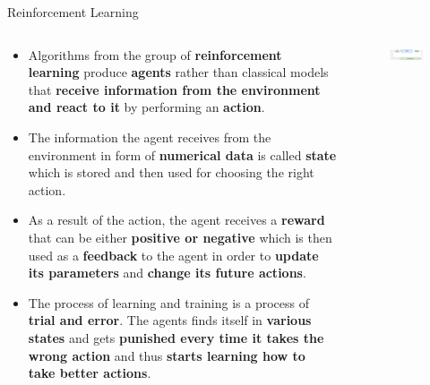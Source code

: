 \documentclass[main.tex]{subfiles}
\begin{document}
    \begin{frame}{Reinforcement Learning}
        \begin{columns}
            \begin{column}{.6\textwidth}
                \begin{itemize}
                    \item Algorithms from the group of \textbf{reinforcement learning} produce \textbf{agents} rather than classical models that \textbf{receive information from the environment and react to it} by performing an \textbf{action}.
                    \item The information the agent receives from the environment in form of \textbf{numerical data} is called \textbf{state} which is stored and then used for choosing the right action.
                    \item As a result of the action, the agent receives a \textbf{reward} that can be either \textbf{positive or negative} which is then used as a \textbf{feedback} to the agent in order to \textbf{update its parameters} and \textbf{change its future actions}.
                    \item The process of learning and training is a process of \textbf{trial and error}. The agents finds itself in \textbf{various states} and gets\textbf{ punished every time it takes the wrong action} and thus \textbf{starts learning how to take better actions}.
                \end{itemize}
            \end{column}
            \begin{column}{.4\textwidth}
                \begin{figure}
                    \label{fig:reinforcement-learning}
                    \includegraphics[width=\textwidth]{figures/drawio/reinforcement-learning.png}
                \end{figure}
            \end{column}
        \end{columns}
    \end{frame}
\end{document}
